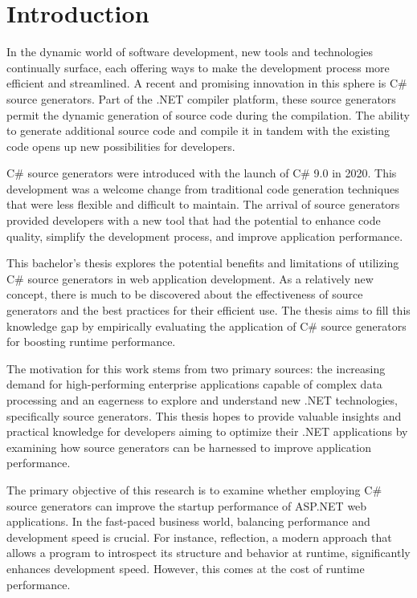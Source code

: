 \chapter{Introduction}

In the dynamic world of software development, new tools and technologies continually surface, each offering ways to make the development process more efficient and streamlined. A recent and promising innovation in this sphere is C\# source generators. Part of the .NET compiler platform, these source generators permit the dynamic generation of source code during the compilation. The ability to generate additional source code and compile it in tandem with the existing code opens up new possibilities for developers.

C\# source generators were introduced with the launch of C\# 9.0 in 2020. This development was a welcome change from traditional code generation techniques that were less flexible and difficult to maintain. The arrival of source generators provided developers with a new tool that had the potential to enhance code quality, simplify the development process, and improve application performance.

This bachelor's thesis explores the potential benefits and limitations of utilizing C\# source generators in web application development. As a relatively new concept, there is much to be discovered about the effectiveness of source generators and the best practices for their efficient use. The thesis aims to fill this knowledge gap by empirically evaluating the application of C\# source generators for boosting runtime performance.

The motivation for this work stems from two primary sources: the increasing demand for high-performing enterprise applications capable of complex data processing and an eagerness to explore and understand new .NET technologies, specifically source generators. This thesis hopes to provide valuable insights and practical knowledge for developers aiming to optimize their .NET applications by examining how source generators can be harnessed to improve application performance.

The primary objective of this research is to examine whether employing C\# source generators can improve the startup performance of ASP.NET web applications. In the fast-paced business world, balancing performance and development speed is crucial. For instance, reflection, a modern approach that allows a program to introspect its structure and behavior at runtime, significantly enhances development speed. However, this comes at the cost of runtime performance. 


